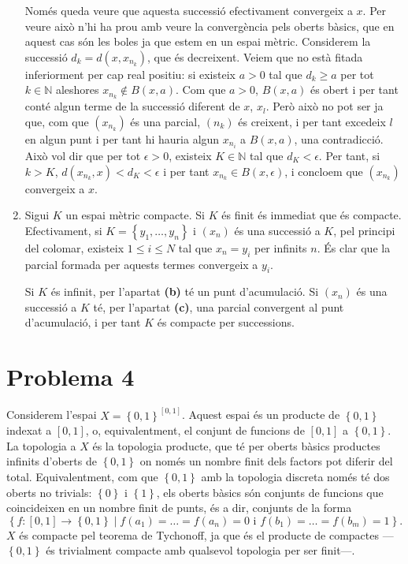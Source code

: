\documentclass[12pt]{article}
\numberwithin{table}{section}
\numberwithin{figure}{section}
\numberwithin{equation}{section}
\newcommand{\N}{\mathbb{N}}
\newcommand{\set}[1]{\left\{ #1\right\}}
\begin{document}
\begin{enumerate}[label=(\alph*), font=\bfseries \sffamily, wide, labelwidth=!, labelindent=0pt]
		Només queda veure que aquesta successió efectivament convergeix a \( x \). Per veure això n'hi ha prou amb veure la convergència pels oberts bàsics, que en aquest cas són les boles ja que estem en un espai mètric. Considerem la successió \( d_k = d(x, x_{n_k}) \), que és decreixent. Veiem que no està fitada inferiorment per cap real positiu: si existeix \( a > 0 \) tal que \( d_k \geq a \) per tot \( k \in \N \) aleshores \( x_{n_k} \notin B(x,a) \). Com que \( a > 0 \), \( B(x, a) \) és obert i per tant conté algun terme de la successió diferent de \( x \), \( x_l \). Però això no pot ser ja que, com que \( (x_{n_k}) \) és una parcial, \( (n_k) \) és creixent, i per tant excedeix \( l \) en algun punt i per tant hi hauria algun \( x_{n_i} \) a \( B(x,a) \), una contradicció. Això vol dir que per tot \( \epsilon > 0 \), existeix \( K \in \N \) tal que \( d_K < \epsilon \). Per tant, si \( k > K \), \( d(x_{n_k}, x) < d_K < \epsilon \) i per tant \( x_{n_k} \in B(x,\epsilon) \), i concloem que \( (x_{n_k}) \) convergeix a \( x \). 

	\item Sigui \( K \) un espai mètric compacte. Si \( K \) és finit és immediat que és compacte. Efectivament, si \( K = \set{y_1, \dots, y_n} \) i \( (x_n) \) és una successió a \( K \), pel principi del colomar, existeix \( 1 \leq i \leq N \) tal que \( x_n = y_i \) per infinits \( n \). És clar que la parcial formada per aquests termes convergeix a \( y_i \).  

		Si \( K \) és infinit, per l'apartat \textbf{\textsf{(b)}} té un punt d'acumulació. Si \( (x_n) \) és una successió a \( K \) té, per l'apartat \textbf{\textsf{(c)}}, una parcial convergent al punt d'acumulació, i per tant \( K \) és compacte per successions.  
\end{enumerate}

\section*{Problema 4}
Considerem l'espai \( X = \set{0,1}^{[0,1]} \). Aquest espai és un producte de \( \set{0,1} \) indexat a \( [0,1] \), o, equivalentment, el conjunt de funcions de \( [0,1] \) a \( \set{0,1} \). La topologia a \( X \) és la topologia producte, que té per oberts bàsics productes infinits d'oberts de \( \set{0,1} \) on només un nombre finit dels factors pot diferir del total. Equivalentment, com que \( \set{0,1} \) amb la topologia discreta només té dos oberts no trivials: \( \set{0} \) i \( \set{1} \), els oberts bàsics són conjunts de funcions que coincideixen en un nombre finit de punts, és a dir, conjunts de la forma
\begin{equation*}
	\set{f \colon [0,1] \to \set{0,1} \mid f(a_1) = \dots = f(a_n) = 0 \text{ i } f(b_1) = \dots = f(b_m) = 1}.
\end{equation*}
\( X \) és compacte pel teorema de Tychonoff, ja que és el producte de compactes --- \( \set{0,1} \) és trivialment compacte amb qualsevol topologia per ser finit---. 
\end{document}
